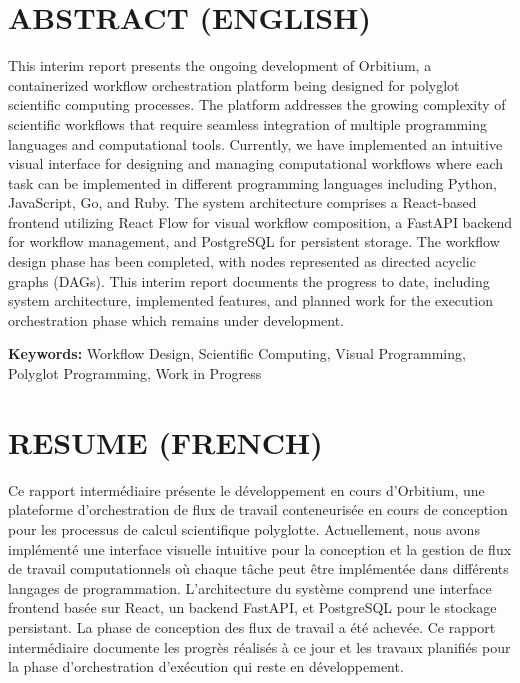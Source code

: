\documentclass[12pt]{article}
\begin{document}
\newpage
\tableofcontents

\newpage
\listoftables
{}

\newpage
\section*{ABSTRACT (ENGLISH)}

\noindent
\parbox{\textwidth}{%
This interim report presents the ongoing development of Orbitium, a containerized workflow orchestration platform being designed for polyglot scientific computing processes. The platform addresses the growing complexity of scientific workflows that require seamless integration of multiple programming languages and computational tools. Currently, we have implemented an intuitive visual interface for designing and managing computational workflows where each task can be implemented in different programming languages including Python, JavaScript, Go, and Ruby. The system architecture comprises a React-based frontend utilizing React Flow for visual workflow composition, a FastAPI backend for workflow management, and PostgreSQL for persistent storage. The workflow design phase has been completed, with nodes represented as directed acyclic graphs (DAGs). This interim report documents the progress to date, including system architecture, implemented features, and planned work for the execution orchestration phase which remains under development.
}

\vspace{1cm}

\noindent
\textbf{Keywords:} Workflow Design, Scientific Computing, Visual Programming, Polyglot Programming, Work in Progress

\vspace{2cm}

\section*{RESUME (FRENCH)}

\noindent
\parbox{\textwidth}{%
Ce rapport intermédiaire présente le développement en cours d'Orbitium, une plateforme d'orchestration de flux de travail conteneurisée en cours de conception pour les processus de calcul scientifique polyglotte. Actuellement, nous avons implémenté une interface visuelle intuitive pour la conception et la gestion de flux de travail computationnels où chaque tâche peut être implémentée dans différents langages de programmation. L'architecture du système comprend une interface frontend basée sur React, un backend FastAPI, et PostgreSQL pour le stockage persistant. La phase de conception des flux de travail a été achevée. Ce rapport intermédiaire documente les progrès réalisés à ce jour et les travaux planifiés pour la phase d'orchestration d'exécution qui reste en développement.
}
\end{document}
